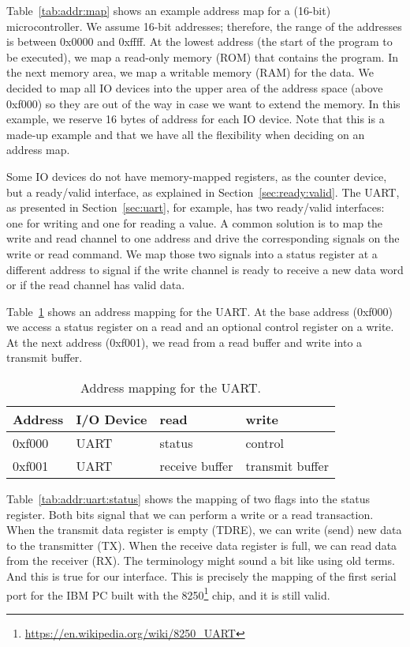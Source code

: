 \documentclass[%
    10pt,
    headinclude, footexclude,
    openright, %
    notitlepage,
    cleardoubleempty,
    headsepline,
    pointlessnumbers,
    bibtotoc, idxtotoc,
    ]{scrbook}
\newcommand{\myref}[2]{\href{#1}{#2}}
\renewcommand{\myref}[2]{{#2}{\footnote{\url{#1}}}}
\begin{document}
Table~\ref{tab:addr:map} shows an example address map for a (16-bit) microcontroller.
We assume 16-bit addresses; therefore, the range of the addresses is between 0x0000 and
0xffff.
At the lowest address (the start of the program to be executed), we map a read-only
memory (ROM) that contains the program. In the next memory area, we map
a writable memory (RAM) for the data. We decided to map all IO devices into the
upper area of the address space (above 0xf000) so they are out of the way in case
we want to extend the memory. In this example, we reserve 16 bytes of address for
each IO device. Note that this is a made-up example and that we have all the flexibility when
deciding on an address map.

Some IO devices do not have memory-mapped registers, as the counter device,
but a ready/valid interface, as explained in Section~\ref{sec:ready:valid}.
The UART, as presented in Section~\ref{sec:uart}, for example, has two
ready/valid interfaces: one for writing and one for reading a value.
A common solution is to map the write and read channel to one address and drive
the corresponding signals on the write or read command. We map those two signals into a status register at a different address to signal if the write channel
is ready to receive a new data word or if the read channel has valid data.

Table~\ref{tab:addr:uart} shows an address mapping for the UART. At the base address (0xf000)
we access a status register on a read and an optional control register on a write.
At the next address (0xf001), we read from a read buffer and write into
a transmit buffer.

\begin{table}
\centering
\begin{tabular}{llll}
\toprule
Address & I/O Device & read & write \\
\midrule
0xf000 & UART & status & control \\
0xf001 & UART & receive buffer & transmit buffer \\
\bottomrule
\end{tabular}
\caption{Address mapping for the UART.}
\label{tab:addr:uart}
\end{table}

Table~\ref{tab:addr:uart:status} shows the mapping of two flags into the status register.
Both bits signal that we can perform a write or a read transaction. When the transmit data register
is empty (TDRE), we can write (send) new data to the transmitter (TX).
When the receive data register is full, we can read data from the receiver (RX).
The terminology might sound a bit like using old terms. And this is true for our
interface. This is precisely the mapping of the first serial port for the IBM PC
built with the \myref{https://en.wikipedia.org/wiki/8250_UART}{8250} chip,
and it is still valid.
\end{document}
